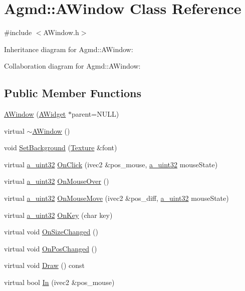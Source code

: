 \hypertarget{class_agmd_1_1_a_window}{\section{Agmd\+:\+:A\+Window Class Reference}
\label{class_agmd_1_1_a_window}
}


{\ttfamily \#include $<$A\+Window.\+h$>$}



Inheritance diagram for Agmd\+:\+:A\+Window\+:


Collaboration diagram for Agmd\+:\+:A\+Window\+:
\subsection*{Public Member Functions}
\begin{DoxyCompactItemize}
\item 
\hyperlink{class_agmd_1_1_a_window_a978b56ae79fbeed8dded9f23f8bfd63a}{A\+Window} (\hyperlink{class_agmd_1_1_a_widget}{A\+Widget} $\ast$parent=N\+U\+L\+L)
\item 
virtual \hyperlink{class_agmd_1_1_a_window_a7abf541e4b8ad4ff2131f96f2c37763b}{$\sim$\+A\+Window} ()
\item 
void \hyperlink{class_agmd_1_1_a_window_aa3f0706dc95de63a338f0782fea2adcf}{Set\+Background} (\hyperlink{class_agmd_1_1_texture}{Texture} \&font)
\item 
virtual \hyperlink{_common_defines_8h_a964296f9770051b9e4807b1f180dd416}{a\+\_\+uint32} \hyperlink{class_agmd_1_1_a_window_a573b3e032717a4802652ecb39352d671}{On\+Click} (ivec2 \&pos\+\_\+mouse, \hyperlink{_common_defines_8h_a964296f9770051b9e4807b1f180dd416}{a\+\_\+uint32} mouse\+State)
\item 
virtual \hyperlink{_common_defines_8h_a964296f9770051b9e4807b1f180dd416}{a\+\_\+uint32} \hyperlink{class_agmd_1_1_a_window_a8b05f14eeccdee50b74437f13e87030b}{On\+Mouse\+Over} ()
\item 
virtual \hyperlink{_common_defines_8h_a964296f9770051b9e4807b1f180dd416}{a\+\_\+uint32} \hyperlink{class_agmd_1_1_a_window_abfedc933f038a4d4cbdebfd4bb0aecb1}{On\+Mouse\+Move} (ivec2 \&pos\+\_\+diff, \hyperlink{_common_defines_8h_a964296f9770051b9e4807b1f180dd416}{a\+\_\+uint32} mouse\+State)
\item 
virtual \hyperlink{_common_defines_8h_a964296f9770051b9e4807b1f180dd416}{a\+\_\+uint32} \hyperlink{class_agmd_1_1_a_window_afb0acc2601624a60a02b51f9f472feb5}{On\+Key} (char key)
\item 
virtual void \hyperlink{class_agmd_1_1_a_window_a3350ddebc8fea2807968939d8a30b059}{On\+Size\+Changed} ()
\item 
virtual void \hyperlink{class_agmd_1_1_a_window_a38c8f508b64d725bb918255b0d923da5}{On\+Pos\+Changed} ()
\item 
virtual void \hyperlink{class_agmd_1_1_a_window_a93b410b17d973df5bb16ae0ddadb45bf}{Draw} () const 
\item 
virtual bool \hyperlink{class_agmd_1_1_a_window_a5fa5a01cdc1b210fd98a19755c9dc748}{In} (ivec2 \&pos\+\_\+mouse)
\end{DoxyCompactItemize}

